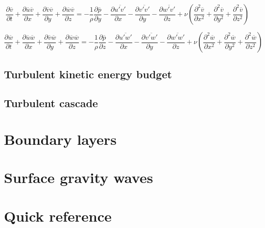 \documentclass[12pt]{article}
\numberwithin{equation}{section}
\numberwithin{figure}{section}
\numberwithin{table}{section}
\begin{document}
\begin{equation}
  \frac{\partial \overline{v}}{\partial t} + 
  \frac{\partial \overline{u} \overline{v}}{\partial x} +
  \frac{\partial \overline{v} \overline{v}}{\partial y} +
  \frac{\partial \overline{w} \overline{v}}{\partial z} =
  - \frac{1}{\rho} \frac{\partial \overline{p}}{\partial y}
  - \frac{\partial \overline{u'v'}}{\partial x} - \frac{\partial \overline{v'v'}}{\partial y} - \frac{\partial \overline{w'v'}}{\partial z}
  + \nu \left( \frac{\partial^2 \overline{v}}{\partial x^2} + 
               \frac{\partial^2 \overline{v}}{\partial y^2} +
               \frac{\partial^2 \overline{v}}{\partial z^2}
        \right)
\end{equation}

\begin{equation}
  \frac{\partial \overline{w}}{\partial t} + 
  \frac{\partial \overline{u} \overline{w}}{\partial x} +
  \frac{\partial \overline{v} \overline{w}}{\partial y} +
  \frac{\partial \overline{w} \overline{w}}{\partial z} =
  - \frac{1}{\rho} \frac{\partial \overline{p}}{\partial z}
  - \frac{\partial \overline{u'w'}}{\partial x} - \frac{\partial \overline{v'w'}}{\partial y} - \frac{\partial \overline{w'w'}}{\partial z}
  + \nu \left( \frac{\partial^2 \overline{w}}{\partial x^2} + 
               \frac{\partial^2 \overline{w}}{\partial y^2} +
               \frac{\partial^2 \overline{w}}{\partial z^2}
        \right)
\end{equation}

\subsection{Turbulent kinetic energy budget}

\subsection{Turbulent cascade}

\newpage
\section{Boundary layers}

\newpage
\section{Surface gravity waves}

\newpage
\appendix

\section{Quick reference}
\end{document}
